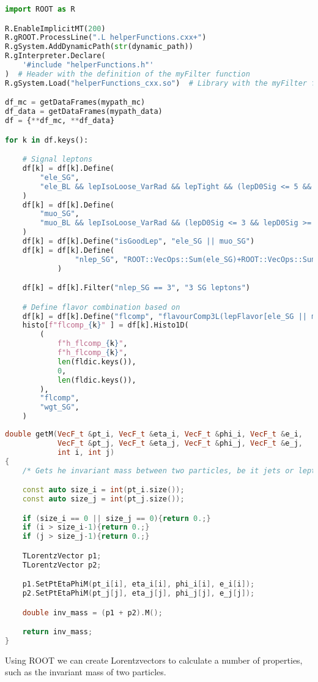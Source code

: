 \begin{lstlisting}[language=Python, style=pythonstyle, label={code:python_func_example}]
import ROOT as R

R.EnableImplicitMT(200)
R.gROOT.ProcessLine(".L helperFunctions.cxx+")
R.gSystem.AddDynamicPath(str(dynamic_path))
R.gInterpreter.Declare(
    '#include "helperFunctions.h"'
)  # Header with the definition of the myFilter function
R.gSystem.Load("helperFunctions_cxx.so")  # Library with the myFilter function

df_mc = getDataFrames(mypath_mc)
df_data = getDataFrames(mypath_data)
df = {**df_mc, **df_data}

for k in df.keys():

    # Signal leptons
    df[k] = df[k].Define(
        "ele_SG",
        "ele_BL && lepIsoLoose_VarRad && lepTight && (lepD0Sig <= 5 && lepD0Sig >= -5)",
    )  
    df[k] = df[k].Define(
        "muo_SG",
        "muo_BL && lepIsoLoose_VarRad && (lepD0Sig <= 3 && lepD0Sig >= -3)",
    )  
    df[k] = df[k].Define("isGoodLep", "ele_SG || muo_SG")
    df[k] = df[k].Define(
                "nlep_SG", "ROOT::VecOps::Sum(ele_SG)+ROOT::VecOps::Sum(muo_SG)"
            )

    df[k] = df[k].Filter("nlep_SG == 3", "3 SG leptons")

    # Define flavor combination based on 
    df[k] = df[k].Define("flcomp", "flavourComp3L(lepFlavor[ele_SG || muo_SG])")
    histo[f"flcomp_{k}" ] = df[k].Histo1D(
        (
            f"h_flcomp_{k}",
            f"h_flcomp_{k}",
            len(fldic.keys()),
            0,
            len(fldic.keys()),
        ),
        "flcomp",
        "wgt_SG",
    )
    \end{lstlisting}




\begin{lstlisting}[language=C++, style=cppstyle, label={code:cpp_func_example}]
double getM(VecF_t &pt_i, VecF_t &eta_i, VecF_t &phi_i, VecF_t &e_i,
            VecF_t &pt_j, VecF_t &eta_j, VecF_t &phi_j, VecF_t &e_j,
            int i, int j)
{
    /* Gets he invariant mass between two particles, be it jets or leptons */

    const auto size_i = int(pt_i.size());
    const auto size_j = int(pt_j.size());

    if (size_i == 0 || size_j == 0){return 0.;}
    if (i > size_i-1){return 0.;}
    if (j > size_j-1){return 0.;}

    TLorentzVector p1;
    TLorentzVector p2;

    p1.SetPtEtaPhiM(pt_i[i], eta_i[i], phi_i[i], e_i[i]);
    p2.SetPtEtaPhiM(pt_j[j], eta_j[j], phi_j[j], e_j[j]);

    double inv_mass = (p1 + p2).M();

    return inv_mass;
}
\end{lstlisting}
Using ROOT we can create Lorentzvectors to calculate a number of properties, such as the invariant mass of two particles.




